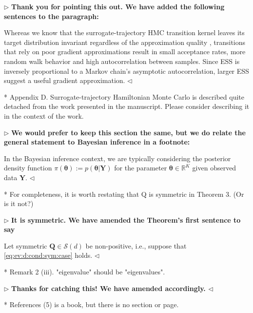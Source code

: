 \documentclass[12pt]{article}
\newenvironment{reply}{$\triangleright$\bfseries}{$\triangleleft$}
\renewenvironment{quote}
               {\list{}{\rightmargin\leftmargin}%
                \item\relax\normalfont}
               {\endlist}
\newcommand{\QQ}{\mathbf{Q}}
\newcommand{\ttheta}{\boldsymbol{\theta}}
\begin{document}
\begin{reply}
	Thank you for pointing this out.  We have added the following sentences to the paragraph:
	\begin{quote}
		Whereas we know that the surrogate-trajectory HMC transition kernel leaves its target distribution invariant regardless of the approximation quality \citep{glatt2020accept}, transitions that rely on poor gradient approximations result in small acceptance rates, more random walk behavior and high autocorrelation between samples.  Since ESS is inversely proportional to a Markov chain's asymptotic autocorrelation, larger ESS suggest a useful gradient approximation.
	\end{quote}
\end{reply}

* Appendix D. Surrogate-trajectory Hamiltonian Monte Carlo is described quite detached from the work presented in the manuscript. Please consider describing it in the context of the work. 

\newcommand{\Y}{\mathbf{Y}}
\begin{reply}
	We would prefer to keep this section the same, but we do relate the general statement to Bayesian inference in a footnote:
	\begin{quote}
		In the Bayesian inference context, we are typically
		considering the posterior density function
		$\pi(\ttheta):=p(\ttheta|\Y)$ for the parameter
		$\ttheta\in\mathbb{R}^K$ given observed data $\Y$.
	\end{quote}
\end{reply}

* For completeness, it is worth restating that Q is symmetric in Theorem 3. (Or is it not?) 

\begin{reply}
It is symmetric.  We have amended the Theorem's first sentence to say
\begin{quote}
	Let symmetric $\QQ \in \mathcal{S}(d)$ be non-positive, i.e.,  suppose that
	\eqref{eq:ev:d:cond:sym:case} holds.
\end{quote}
\end{reply}

* Remark 2 (iii). "eigenvalue" should be "eigenvalues". 

\begin{reply}
Thanks for catching this!  We have amended accordingly. 
\end{reply}

* References (5) is a book, but there is no section or page.
\end{document}
